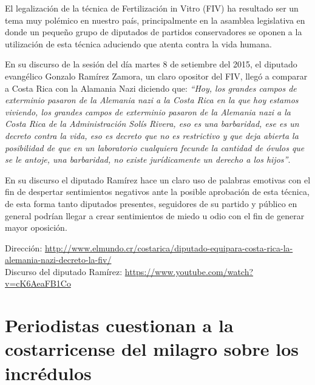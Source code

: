 \documentclass[times]{simauth}
\begin{document}
El legalización de la técnica de Fertilización in Vitro (FIV) ha resultado ser un tema muy polémico en nuestro país, principalmente en la asamblea legislativa en donde un pequeño grupo de diputados de partidos conservadores se oponen a la utilización de esta técnica aduciendo que atenta contra la vida humana.

En su discurso de la sesión del día martes 8 de setiembre del 2015, el diputado evangélico Gonzalo Ramírez Zamora, un claro opositor del FIV, llegó a comparar a Costa Rica con la Alamania Nazi diciendo que: \textit{``Hoy, los grandes campos de exterminio pasaron de la Alemania nazi a la Costa Rica en la que hoy estamos viviendo, los grandes campos de exterminio pasaron de la Alemania nazi a la Costa Rica de la Administración Solís Rivera, eso es una barbaridad, ese es un decreto contra la vida, eso es decreto que no es restrictivo y que deja abierta la posibilidad de que en un laboratorio cualquiera fecunde la cantidad de óvulos que se le antoje, una barbaridad, no existe jurídicamente un derecho a los hijos''}.

En su discurso el diputado Ramírez hace un claro uso de palabras emotivas con el fin de despertar sentimientos negativos ante la posible aprobación de esta técnica, de esta forma tanto diputados presentes, seguidores de su partido y público en general podrían llegar a crear sentimientos de miedo u odio con el fin de generar mayor oposición.

\noindent Dirección: \href{http://www.elmundo.cr/costarica/diputado-equipara-costa-rica-la-alemania-nazi-decreto-la-fiv/}{http://www.elmundo.cr/costarica/diputado-equipara-costa-rica-la-alemania-nazi-decreto-la-fiv/} \\
Discurso del diputado Ramírez: \href{https://www.youtube.com/watch?v=cK6AeaFB1Co}{https://www.youtube.com/watch?v=cK6AeaFB1Co}\\


\newpage
\section{Periodistas cuestionan a la costarricense del milagro sobre los incrédulos}
\end{document}

